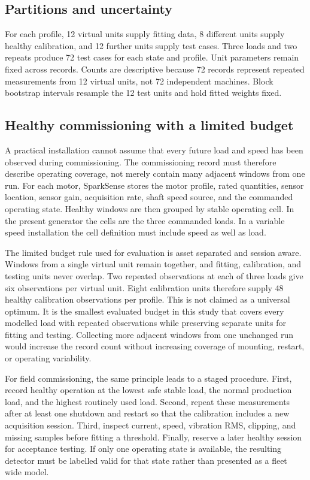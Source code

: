 \documentclass[10pt,twocolumn]{article}
\begin{document}
\subsection{Partitions and uncertainty}
For each profile, 12 virtual units supply fitting data, 8 different units supply healthy calibration, and 12 further units supply test cases. Three loads and two repeats produce 72 test cases for each state and profile. Unit parameters remain fixed across records. Counts are descriptive because 72 records represent repeated measurements from 12 virtual units, not 72 independent machines. Block bootstrap intervals resample the 12 test units and hold fitted weights fixed.

\subsection{Healthy commissioning with a limited budget}
A practical installation cannot assume that every future load and speed has been observed during commissioning. The commissioning record must therefore describe operating coverage, not merely contain many adjacent windows from one run. For each motor, SparkSense stores the motor profile, rated quantities, sensor location, sensor gain, acquisition rate, shaft speed source, and the commanded operating state. Healthy windows are then grouped by stable operating cell. In the present generator the cells are the three commanded loads. In a variable speed installation the cell definition must include speed as well as load.

The limited budget rule used for evaluation is asset separated and session aware. Windows from a single virtual unit remain together, and fitting, calibration, and testing units never overlap. Two repeated observations at each of three loads give six observations per virtual unit. Eight calibration units therefore supply 48 healthy calibration observations per profile. This is not claimed as a universal optimum. It is the smallest evaluated budget in this study that covers every modelled load with repeated observations while preserving separate units for fitting and testing. Collecting more adjacent windows from one unchanged run would increase the record count without increasing coverage of mounting, restart, or operating variability.

For field commissioning, the same principle leads to a staged procedure. First, record healthy operation at the lowest safe stable load, the normal production load, and the highest routinely used load. Second, repeat these measurements after at least one shutdown and restart so that the calibration includes a new acquisition session. Third, inspect current, speed, vibration RMS, clipping, and missing samples before fitting a threshold. Finally, reserve a later healthy session for acceptance testing. If only one operating state is available, the resulting detector must be labelled valid for that state rather than presented as a fleet wide model.
\end{document}
